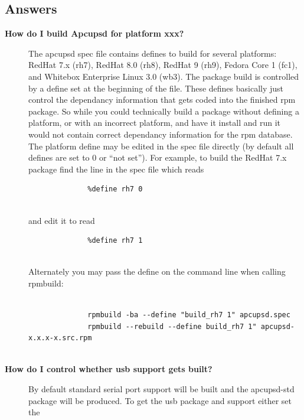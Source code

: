 {{{{{{{{{{{{{{{{{\label{Answers}

\subsection*{Answers}

\begin{description}

\item [{\bf How do I build Apcupsd for platform xxx?}]
   The apcupsd spec file contains defines to build for several platforms: RedHat
7.x (rh7), RedHat 8.0 (rh8), RedHat 9 (rh9), Fedora Core 1 (fc1), and Whitebox
Enterprise Linux 3.0 (wb3).  The package build is controlled by a define set
at the beginning of the file. These defines basically just control the
dependancy information that gets coded into the finished rpm package.  So
while you could technically build a package without defining a platform, or
with an incorrect platform, and have it install and run it would not contain
correct dependancy information for the rpm database.  The platform define may
be edited in the spec file directly (by default all defines are set to 0 or
``not set'').  For example, to build the RedHat 7.x package find the line in
the spec file which reads  

\footnotesize
\begin{verbatim}
              %define rh7 0
     
\end{verbatim}
\normalsize

and edit it to read  

\footnotesize
\begin{verbatim}
              %define rh7 1
     
\end{verbatim}
\normalsize

Alternately you may pass the define on the command line when calling rpmbuild:
 

\footnotesize
\begin{verbatim}
          
              rpmbuild -ba --define "build_rh7 1" apcupsd.spec
              rpmbuild --rebuild --define build_rh7 1" apcupsd-x.x.x-x.src.rpm
     
\end{verbatim}
\normalsize


\item [{\bf How do I control whether usb support gets built?}]
   By default standard serial port support will be built and the apcupsd-std
package will be produced. To get the usb package and support either set the  


\end{description}}}}}}}}}}}}}}}}}}
